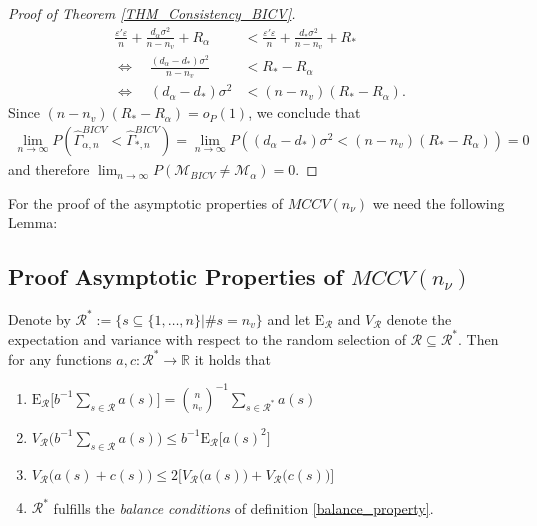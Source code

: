 \documentclass[Research_Module_ES.tex]{subfiles}
\begin{document}
\begin{proof}[Proof of Theorem \ref{THM_Consistency_BICV}]
\begin{align*}
	\frac{\varepsilon'\varepsilon}{n}+\frac{d_\alpha\sigma^2}{n-n_v} +R_\alpha
	&< \frac{\varepsilon'\varepsilon}{n}+\frac{d_\ast\sigma^2}{n-n_v} +R_\ast\\
	\iff \quad \frac{(d_\alpha-d_\ast)\sigma^2}{n-n_v} &< R_\ast -R_\alpha\\
	\iff \quad(d_\alpha-d_\ast)\sigma^2 &< (n-n_v)(R_\ast -R_\alpha).
	\end{align*}
	Since $(n-n_v)(R_\ast -R_\alpha)=o_P(1)$, we conclude that 
	\begin{align*}
	\lim_{n\to\infty} P\left(\hat{\Gamma}_{\alpha,n}^{BICV} < \hat{\Gamma}_{\ast,n}^{BICV}\right) 
	=\lim_{n\to\infty}P\left((d_\alpha-d_\ast)\sigma^2 < (n-n_v)(R_\ast -R_\alpha)\right) = 0 
	\end{align*}
	and therefore $\lim_{n\to\infty}P(\mathcal{M}_{BICV}\neq \mathcal{M}_\alpha) = 0$.
\end{proof}

For the proof of the asymptotic properties of $MCCV(n_\nu)$ we need the following Lemma:  
\subsection*{Proof Asymptotic Properties of $MCCV(n_\nu)$}
\begin{lemma}
	\label{Lemma_MCCV}
	Denote by $\mathcal{R}^\ast:= \{s\subseteq\{1,\dots,n\}|\# s=n_v\}$ and let $\mathrm{E}_\mathcal{R}$ and $V_\mathcal{R}$ denote the expectation and variance with respect to the random selection of $\mathcal{R}\subseteq\mathcal{R}^\ast$. Then for any functions $a,c:\mathcal{R}^\ast\to \mathbb{R}$ it holds that
	\begin{enumerate}
		\item $\mathrm{E}_\mathcal{R} \bigl[ b^{-1}\sum_{s\in \mathcal{R}}a(s)\bigr] = \binom{n}{n_v}^{-1}\sum_{s\in\mathcal{R}^\ast}a(s)$
		\item $V_\mathcal{R} \bigl( b^{-1}\sum_{s\in \mathcal{R}}a(s)\bigr) \le b^{-1} \mathrm{E}_\mathcal{R} \bigl[a(s)^2\bigr]$
		\item $V_\mathcal{R}\bigl(a(s)+c(s)\bigr) \le 2\bigl[V_\mathcal{R}\bigl(a(s)\bigr)+V_\mathcal{R}\bigl(c(s)\bigr)\bigr]$
		\item $\mathcal{R}^\ast$ fulfills the \textit{balance conditions} of definition \ref{balance_property}.
	\end{enumerate}
\end{lemma}
\end{document}

